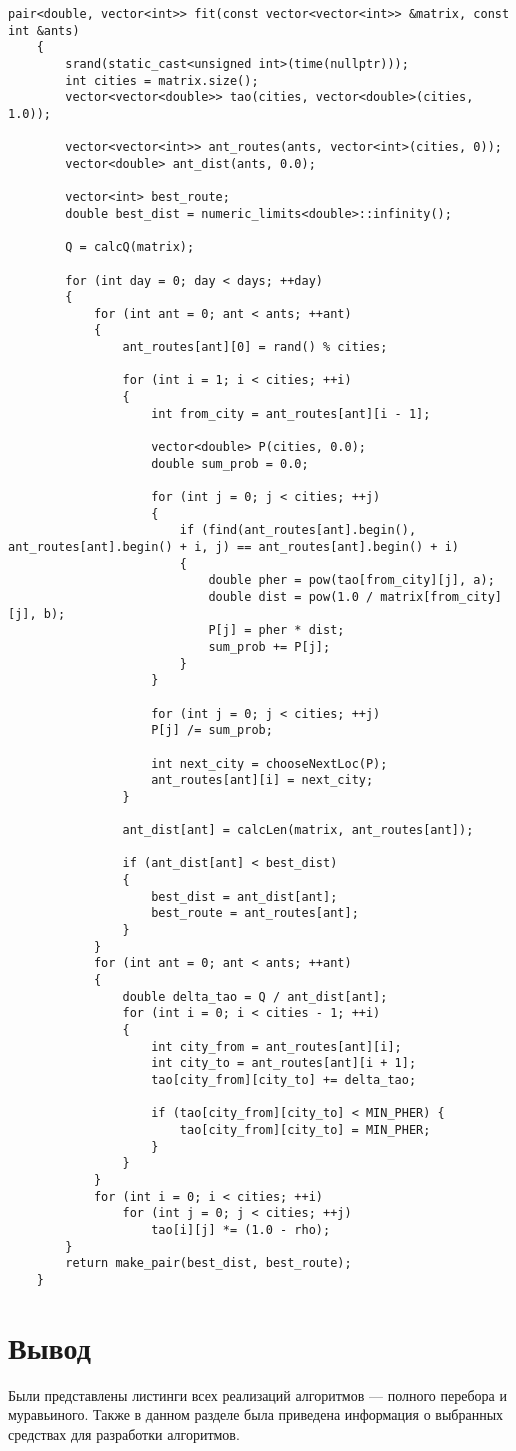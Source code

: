 \begin{lstlisting}[caption=Муравьиный алгоритм]
	pair<double, vector<int>> fit(const vector<vector<int>> &matrix, const int &ants) 
	{
		srand(static_cast<unsigned int>(time(nullptr)));
		int cities = matrix.size();
		vector<vector<double>> tao(cities, vector<double>(cities, 1.0)); 
		
		vector<vector<int>> ant_routes(ants, vector<int>(cities, 0)); 
		vector<double> ant_dist(ants, 0.0); 
		
		vector<int> best_route; 
		double best_dist = numeric_limits<double>::infinity();
		
		Q = calcQ(matrix);
		
		for (int day = 0; day < days; ++day) 
		{
			for (int ant = 0; ant < ants; ++ant) 
			{
				ant_routes[ant][0] = rand() % cities;
				
				for (int i = 1; i < cities; ++i) 
				{
					int from_city = ant_routes[ant][i - 1];
					
					vector<double> P(cities, 0.0);
					double sum_prob = 0.0;
					
					for (int j = 0; j < cities; ++j) 
					{
						if (find(ant_routes[ant].begin(), ant_routes[ant].begin() + i, j) == ant_routes[ant].begin() + i) 
						{
							double pher = pow(tao[from_city][j], a);
							double dist = pow(1.0 / matrix[from_city][j], b);
							P[j] = pher * dist;
							sum_prob += P[j];
						}
					}
					
					for (int j = 0; j < cities; ++j)
					P[j] /= sum_prob;
					
					int next_city = chooseNextLoc(P);
					ant_routes[ant][i] = next_city;
				}
				
				ant_dist[ant] = calcLen(matrix, ant_routes[ant]);
				
				if (ant_dist[ant] < best_dist) 
				{
					best_dist = ant_dist[ant];
					best_route = ant_routes[ant];
				}
			}
			for (int ant = 0; ant < ants; ++ant) 
			{
				double delta_tao = Q / ant_dist[ant];
				for (int i = 0; i < cities - 1; ++i) 
				{
					int city_from = ant_routes[ant][i];
					int city_to = ant_routes[ant][i + 1];
					tao[city_from][city_to] += delta_tao;
					
					if (tao[city_from][city_to] < MIN_PHER) {
						tao[city_from][city_to] = MIN_PHER;
					}
				}
			}
			for (int i = 0; i < cities; ++i)
				for (int j = 0; j < cities; ++j)
					tao[i][j] *= (1.0 - rho);
		}
		return make_pair(best_dist, best_route);
	}
\end{lstlisting}

\section*{Вывод}

Были представлены листинги всех реализаций алгоритмов --- полного перебора и муравьиного. 
Также в данном разделе была приведена информация о выбранных средствах для разработки алгоритмов.